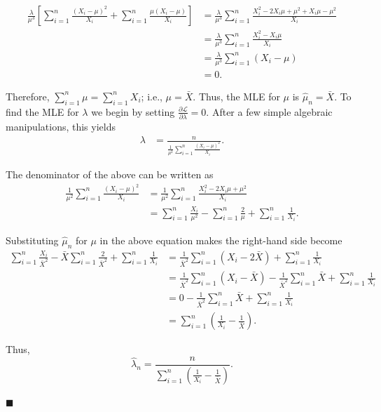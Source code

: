 \documentclass{article}
\begin{document}
\begin{align}
\frac{\lambda}{\mu^3}\left[\sum\limits_{i=1}^n\frac{(X_i-\mu)^2}{X_i} + \sum\limits_{i=1}^n\frac{\mu(X_i-\mu)}{X_i} \right] &= \frac{\lambda}{\mu^3}\sum\limits_{i=1}^n\frac{X_i^2-2X_i\mu+\mu^2+X_i\mu-\mu^2}{X_i} \\
&= \frac{\lambda}{\mu^3}\sum\limits_{i=1}^n\frac{X_i^2-X_i\mu}{X_i} \\
&= \frac{\lambda}{\mu^3}\sum\limits_{i=1}^n(X_i-\mu) \\
&= 0.
\end{align}

\noindent Therefore, $\sum\limits_{i=1}^n\mu = \sum\limits_{i=1}^nX_i$; i.e., $\mu = \bar{X}.$  Thus, the MLE for $\mu$ is $\hat{\mu}_n = \bar{X}$.  To find the MLE for $\lambda$ we begin by setting $\frac{\partial\mathscr{L}}{\partial\lambda} = 0.$  After a few simple algebraic manipulations, this yields
\begin{align}
\lambda &= \frac{n}{\frac{1}{\mu^2}\sum\limits_{i=1}^n\frac{(X_i-\mu)^2}{X_i}}.
\end{align}

\noindent The denominator of the above can be written as
\begin{align}
\frac{1}{\mu^2}\sum\limits_{i=1}^n\frac{(X_i-\mu)^2}{X_i} &= \frac{1}{\mu^2}\sum\limits_{i=1}^n\frac{X_i^2-2X_i\mu + \mu^2}{X_i} \\
&= \sum\limits_{i=1}^n\frac{X_i}{\mu^2} - \sum\limits_{i=1}^n\frac{2}{\mu} + \sum\limits_{i=1}^n\frac{1}{X_i}.
\end{align}

\noindent Substituting $\hat{\mu}_n$ for $\mu$ in the above equation makes the right-hand side become 
\begin{align}
\sum\limits_{i=1}^n \frac{X_i}{\bar{X}^2} - \bar{X}\sum\limits_{i=1}^n\frac{2}{\bar{X}^2} + \sum\limits_{i=1}^n \frac{1}{X_i} &= \frac{1}{\bar{X}^2}\sum\limits_{i=1}^n (X_i - 2\bar{X}) + \sum\limits_{i=1}^n \frac{1}{X_i} \\
&= \frac{1}{\bar{X}^2}\sum\limits_{i=1}^n (X_i - \bar{X}) -\frac{1}{\bar{X}^2}\sum\limits_{i=1}^n\bar{X} + \sum\limits_{i=1}^n \frac{1}{X_i} \\
&= 0 -\frac{1}{\bar{X}^2}\sum\limits_{i=1}^n\bar{X} + \sum\limits_{i=1}^n \frac{1}{X_i} \\
&= \sum\limits_{i=1}^n\left(\frac{1}{X_i} - \frac{1}{\bar{X}}\right).
\end{align}

\noindent Thus, $$\hat{\lambda}_n = \frac{n}{\sum\limits_{i=1}^n\left(\frac{1}{X_i} - \frac{1}{\bar{X}}\right)}.$$  

\hfill$\blacksquare$
\end{document}
